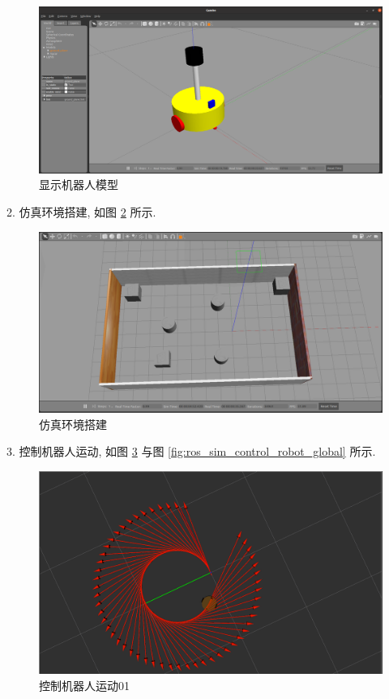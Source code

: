 \documentclass[openany, fontset=windowsold]{ctexbook}
\theoremstyle{kaiti}
\theoremstyle{normal}
\begin{document}
\begin{figure}[!ht]
  \centering
  \includegraphics[width=.9\textwidth]{ros_sim_show_robot.png}
  \caption{显示机器人模型}
  \label{fig:ros_sim_show_robot}
\end{figure}

2. 仿真环境搭建, 如图 \ref{fig:ros_sim_build_env} 所示.

\begin{figure}[!ht]
  \centering
  \includegraphics[width=.9\textwidth]{ros_sim_build_env.png}
  \caption{仿真环境搭建}
  \label{fig:ros_sim_build_env}
\end{figure}

3. 控制机器人运动, 如图 \ref{fig:ros_sim_control_robot_local} 与图 \ref{fig:ros_sim_control_robot_global} 所示.

\begin{figure}[!ht]
  \centering
  \includegraphics[width=.7\textwidth]{ros_sim_control_robot_local.png}
  \caption{控制机器人运动01}
  \label{fig:ros_sim_control_robot_local}
\end{figure}
\end{document}
